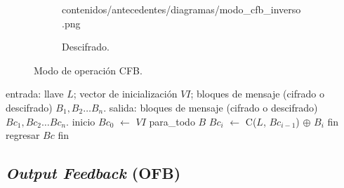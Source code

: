 \begin{figure}[H]
\begin{subfigure}{0.45\textwidth}
\begin{center}
            {contenidos/antecedentes/diagramas/modo_cfb_inverso.png}
          \caption{Descifrado.}
      \end{center}
  \end{subfigure}
  \caption{Modo de operación CFB.}
  \label{fig:cfb}
\end{figure}

\begin{pseudocodigo}[caption={Modo de operación CFB (cifrado y descifrado).}, label={cfb:1}]
  entrada: llave $ L $; vector de inicialización $ VI $;
           bloques de mensaje (cifrado o descifrado) $ B_1, B_2 \dots B_n $.
   salida: bloques de mensaje (cifrado o descifrado) $ Bc_1, Bc_2 \dots Bc_n $.
  inicio
    $Bc_0$ $\gets$ $ VI $
    para_todo $B$
      $Bc_i$ $\gets$ C($L$, $Bc_{i - 1}$) $\oplus$ $B_i$
    fin
    regresar $Bc$
  fin
\end{pseudocodigo}


\subsection{\textit{Output Feedback} (OFB)}

